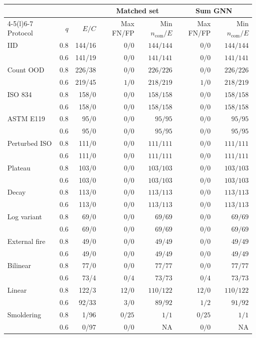 \begin{table}[!htbp]
\centering\small
\caption{\EngineeringScreeningCaption}
\label{tab:engineering-screening}
\setlength{\tabcolsep}{3pt}
\begin{tabular*}{\linewidth}{@{\extracolsep{\fill}}lrrrrrr@{}}
\toprule
& & & \multicolumn{2}{c}{Matched set} & \multicolumn{2}{c}{Sum GNN} \\
\cmidrule(lr){4-5}\cmidrule(l){6-7}
Protocol & $q$ & $E/C$ & Max FN/FP & Min $n_{\mathrm{com}}/E$ & Max FN/FP & Min $n_{\mathrm{com}}/E$ \\
\midrule
IID & 0.8 & 144/16 & $0/0$ & $144/144$ & $0/0$ & $144/144$ \\
 & 0.6 & 141/19 & $0/0$ & $141/141$ & $0/0$ & $141/141$ \\
Count OOD & 0.8 & 226/38 & $0/0$ & $226/226$ & $0/0$ & $226/226$ \\
 & 0.6 & 219/45 & $1/0$ & $218/219$ & $1/0$ & $218/219$ \\
ISO 834 & 0.8 & 158/0 & $0/0$ & $158/158$ & $0/0$ & $158/158$ \\
 & 0.6 & 158/0 & $0/0$ & $158/158$ & $0/0$ & $158/158$ \\
ASTM E119 & 0.8 & 95/0 & $0/0$ & $95/95$ & $0/0$ & $95/95$ \\
 & 0.6 & 95/0 & $0/0$ & $95/95$ & $0/0$ & $95/95$ \\
Perturbed ISO & 0.8 & 111/0 & $0/0$ & $111/111$ & $0/0$ & $111/111$ \\
 & 0.6 & 111/0 & $0/0$ & $111/111$ & $0/0$ & $111/111$ \\
Plateau & 0.8 & 103/0 & $0/0$ & $103/103$ & $0/0$ & $103/103$ \\
 & 0.6 & 103/0 & $0/0$ & $103/103$ & $0/0$ & $103/103$ \\
Decay & 0.8 & 113/0 & $0/0$ & $113/113$ & $0/0$ & $113/113$ \\
 & 0.6 & 113/0 & $0/0$ & $113/113$ & $0/0$ & $113/113$ \\
Log variant & 0.8 & 69/0 & $0/0$ & $69/69$ & $0/0$ & $69/69$ \\
 & 0.6 & 69/0 & $0/0$ & $69/69$ & $0/0$ & $69/69$ \\
External fire & 0.8 & 49/0 & $0/0$ & $49/49$ & $0/0$ & $49/49$ \\
 & 0.6 & 49/0 & $0/0$ & $49/49$ & $0/0$ & $49/49$ \\
Bilinear & 0.8 & 77/0 & $0/0$ & $77/77$ & $0/0$ & $77/77$ \\
 & 0.6 & 73/4 & $0/4$ & $73/73$ & $0/4$ & $73/73$ \\
Linear & 0.8 & 122/3 & $12/0$ & $110/122$ & $12/0$ & $110/122$ \\
 & 0.6 & 92/33 & $3/0$ & $89/92$ & $1/2$ & $91/92$ \\
Smoldering & 0.8 & 1/96 & $0/25$ & $1/1$ & $0/25$ & $1/1$ \\
 & 0.6 & 0/97 & $0/0$ & $\mathrm{NA}$ & $0/0$ & $\mathrm{NA}$ \\
\bottomrule
\end{tabular*}
\end{table}
